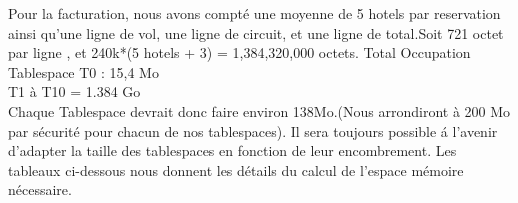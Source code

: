 Pour la facturation, nous avons compt\'e une moyenne de 5 hotels par reservation ainsi qu'une ligne de vol, une ligne de circuit, et une ligne de total.Soit 721 octet par ligne , et 240k*(5 hotels + 3) = 1,384,320,000 octets.
Total Occupation Tablespace T0 : 15,4 Mo\\
T1 à T10 = 1.384 Go\\

Chaque Tablespace devrait donc faire environ 138Mo.(Nous arrondiront \`a 200 Mo par s\'ecurit\'e pour chacun de nos tablespaces).
Il sera toujours possible \'a l'avenir d'adapter la taille des tablespaces en fonction de leur encombrement.
Les tableaux ci-dessous nous donnent les d\'etails du calcul de l'espace m\'emoire n\'ecessaire.

\newpage




